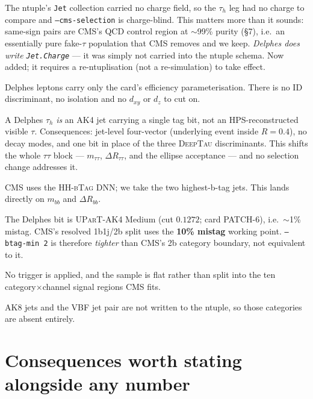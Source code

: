 \documentclass[11pt,a4paper]{article}
\newcommand{\tauh}{\tau_{h}}
\newcommand{\mtautau}{m_{\tau\tau}}
\newcommand{\mbb}{m_{bb}}
\begin{document}
\begin{description}\itemsep3pt
\item[Opposite charge.] The ntuple's \texttt{Jet} collection carried no charge field, so
  the $\tauh$ leg had no charge to compare and \texttt{--cms-selection} is charge-blind.
  This matters more than it sounds: same-sign pairs are CMS's QCD control region at
  $\sim$99\% purity (\S7), i.e.\ an essentially pure fake-$\tau$ population that CMS
  removes and we keep. \emph{Delphes does write \texttt{Jet.Charge}} --- it was simply not
  carried into the ntuple schema. Now added; it requires a re-ntuplisation (not a
  re-simulation) to take effect.
\item[Lepton ID, isolation, impact parameters.] Delphes leptons carry only the card's
  efficiency parameterisation. There is no ID discriminant, no isolation and no $d_{xy}$
  or $d_z$ to cut on.
\item[$\tauh$ object and identification.] A Delphes $\tauh$ \emph{is} an AK4 jet carrying
  a single tag bit, not an HPS-reconstructed visible $\tau$. Consequences: jet-level
  four-vector (underlying event inside $R=0.4$), no decay modes, and one bit in place of
  the three \textsc{DeepTau} discriminants. This shifts the whole $\tau\tau$ block ---
  $\mtautau$, $\Delta R_{\tau\tau}$, and the ellipse acceptance --- and no selection
  change addresses it.
\item[b-jet pair assignment.] CMS uses the HH-\textsc{bTag} DNN; we take the two
  highest-b-tag jets. This lands directly on $\mbb$ and $\Delta R_{bb}$.
\item[b-tag working point.] The Delphes bit is \textsc{UParT}-AK4 Medium (cut $0.1272$;
  card PATCH-6), i.e.\ $\sim$1\% mistag. CMS's resolved 1b1j/2b split uses the
  \textbf{10\% mistag} working point. \texttt{--btag-min 2} is therefore \emph{tighter}
  than CMS's 2b category boundary, not equivalent to it.
\item[Trigger and categorisation.] No trigger is applied, and the sample is flat rather
  than split into the ten category$\times$channel signal regions CMS fits.
\item[Boosted and VBF topologies.] AK8 jets and the VBF jet pair are not written to the
  ntuple, so those categories are absent entirely.
\end{description}

\section{Consequences worth stating alongside any number}
\end{document}
